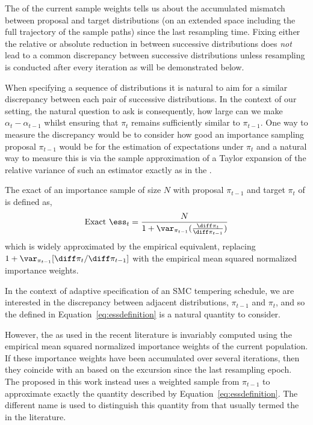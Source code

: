 The \ess of the current sample weights tells us about the accumulated mismatch
between proposal and target distributions (on an extended space including the
full trajectory of the sample paths) since the last resampling time. Fixing
either the relative or absolute reduction in \ess between successive
distributions does \emph{not} lead to a common discrepancy between successive
distributions unless resampling is conducted after every iteration as will be
demonstrated below.

When specifying a sequence of distributions it is natural to aim for a similar
discrepancy between each pair of successive distributions. In the context of
our setting, the natural question to ask is consequently, how large
can we make $\alpha_t - \alpha_{t-1}$ whilst ensuring that $\pi_{t}$ remains
sufficiently similar to $\pi_{t-1}$. One way to measure the discrepancy would
be to consider how good an importance sampling proposal $\pi_{t-1}$ would be
for the estimation of expectations under $\pi_t$ and a natural way to measure
this is via the sample approximation of a Taylor expansion of the relative
variance of such an estimator exactly as in the \ess.

The exact \ess of an importance sample of size $N$ with proposal $\pi_{t-1}$
and target $\pi_t$ of \cite{Kong:1994ul} is defined as,
\begin{equation}
  \text{Exact }\ess_t =
  \frac{N}{1 + \var_{\pi_{t-1}}(\frac{\diff\pi_t}{\diff\pi_{t-1}})}
  \label{eq:essdefinition}
\end{equation}
which is widely approximated by the empirical equivalent, replacing
$1+\var_{\pi_{t-1}}[\diff\pi_t/\diff\pi_{t-1}]$ with the empirical mean
squared normalized importance weights.

In the context of adaptive specification of an SMC tempering schedule, we are
interested in the discrepancy between adjacent distributions, $\pi_{t-1}$ and
$\pi_t$, and so the \ess defined in Equation~\eqref{eq:essdefinition} is a
natural quantity to consider.

However, the \ess as used in the recent \smc literature is invariably computed
using the empirical mean squared normalized importance weights of the current
population. If these importance weights have been accumulated over several
iterations, then they coincide with an \ess based on the excursion since the
last resampling epoch. The \cess proposed in this work instead uses a weighted
sample from $\pi_{t-1}$ to approximate exactly the quantity described by
Equation~\eqref{eq:essdefinition}. The different name is used to distinguish
this quantity from that usually termed the \ess in the \smc literature.

